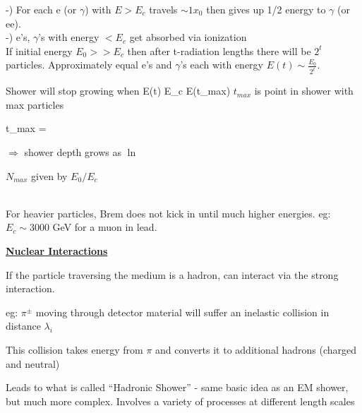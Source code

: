 {\begin{minipage}{0.5\textwidth}
-) For each e (or $\gamma$) with $E > E_c$ travels $\sim 1 x_0$ then gives up 1/2 energy to $\gamma$ (or ee).\\

-) e's, $\gamma$'s with energy $< E_c$ get absorbed via ionization\\

If initial energy $E_0 >> E_c$ then after t-radiation lengths there will be $2^t$ particles. 
Approximately equal e's and $\gamma$'s each with energy $E(t) \sim \frac{E_0 }{2^t}$.

\end{minipage} 

Shower will stop growing when 
\be
E(t) \simeq E_c \equiv E(t_{max})
\ee
$t_{max}$ is point in shower with max particles

\be
t_{max} = 
\ee

$\Rightarrow$ shower depth grows as $\ln$

$N_{max}$ given by $E_0/E_c$

\lineacross\\
For heavier particles, Brem does not kick in until much higher energies.
eg: $    E_c \sim 3000$ GeV for a muon in lead.

\clearpage


\underline{\textbf{Nuclear Interactions} }

If the particle traversing the medium is a hadron, can interact via the strong interaction.

eg: $\pi^\pm$ moving through detector material will suffer an inelastic collision in distance $\lambda_i$

This collision takes energy from $\pi$ and converts it to additional hadrons (charged and neutral)

Leads to what is called ``Hadronic Shower'' - same basic idea as an EM shower, but much more complex.
Involves a variety of processes at different length scales

}
